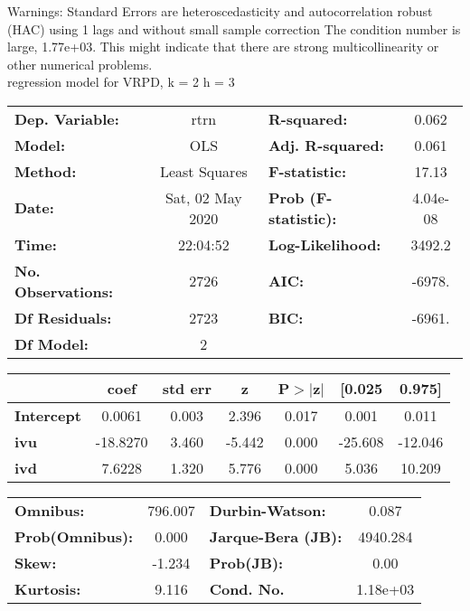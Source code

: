 Warnings: \newline
 [1] Standard Errors are heteroscedasticity and autocorrelation robust (HAC) using 1 lags and without small sample correction \newline
 [2] The condition number is large, 1.77e+03. This might indicate that there are \newline
 strong multicollinearity or other numerical problems.\\ 

regression model for VRPD, k = 2 h = 3\begin{center}
\begin{tabular}{lclc}
\toprule
\textbf{Dep. Variable:}    &       rtrn       & \textbf{  R-squared:         } &     0.062   \\
\textbf{Model:}            &       OLS        & \textbf{  Adj. R-squared:    } &     0.061   \\
\textbf{Method:}           &  Least Squares   & \textbf{  F-statistic:       } &     17.13   \\
\textbf{Date:}             & Sat, 02 May 2020 & \textbf{  Prob (F-statistic):} &  4.04e-08   \\
\textbf{Time:}             &     22:04:52     & \textbf{  Log-Likelihood:    } &    3492.2   \\
\textbf{No. Observations:} &        2726      & \textbf{  AIC:               } &    -6978.   \\
\textbf{Df Residuals:}     &        2723      & \textbf{  BIC:               } &    -6961.   \\
\textbf{Df Model:}         &           2      & \textbf{                     } &             \\
\bottomrule
\end{tabular}
\begin{tabular}{lcccccc}
                   & \textbf{coef} & \textbf{std err} & \textbf{z} & \textbf{P$> |$z$|$} & \textbf{[0.025} & \textbf{0.975]}  \\
\midrule
\textbf{Intercept} &       0.0061  &        0.003     &     2.396  &         0.017        &        0.001    &        0.011     \\
\textbf{ivu}       &     -18.8270  &        3.460     &    -5.442  &         0.000        &      -25.608    &      -12.046     \\
\textbf{ivd}       &       7.6228  &        1.320     &     5.776  &         0.000        &        5.036    &       10.209     \\
\bottomrule
\end{tabular}
\begin{tabular}{lclc}
\textbf{Omnibus:}       & 796.007 & \textbf{  Durbin-Watson:     } &    0.087  \\
\textbf{Prob(Omnibus):} &   0.000 & \textbf{  Jarque-Bera (JB):  } & 4940.284  \\
\textbf{Skew:}          &  -1.234 & \textbf{  Prob(JB):          } &     0.00  \\
\textbf{Kurtosis:}      &   9.116 & \textbf{  Cond. No.          } & 1.18e+03  \\
\bottomrule
\end{tabular}
\end{center}

